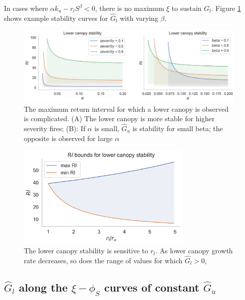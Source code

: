 \documentclass{article}
\begin{document}
In cases where ${\alpha k_u - r_l S^\beta} < 0$, there is no maximum $\xi$ to sustain $G_l$.
Figure \ref{fig:G_l_stability_v_alpha} shows example stability curves for $\hat G_l$ with varying $\beta$.
        
 \begin{figure}[h]
 \centering
\includegraphics[width=40pc]{../fire_plots/G_l_stability_v_alpha}
 \caption{ The maximum return interval for which a lower canopy is observed is complicated.  (A) The lower canopy is more stable for higher severity fires; 
 (B): If  $\alpha$ is small, $\hat G_u$ is stability for small beta; the opposite is observed for large $\alpha$}
 \label{fig:G_l_stability_v_alpha}
 \end{figure}
   

 \begin{figure}[h]
 \centering
\includegraphics[width=20pc]{../fire_plots/G_l_stability_v_rl}
 \caption{ The lower canopy stability is sensitive to $r_l$. As lower canopy growth rate decreases, so does the range of values for which $\hat G_l > 0$,}
 \label{fig:G_l_stability_v_rl}
 \end{figure}
  

  \subsection{$\hat G_l$ along the  $\xi - \phi_S$ curves of constant $\hat G_u$}
\end{document}
